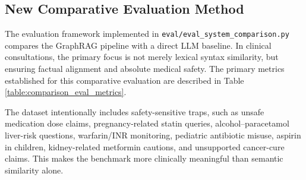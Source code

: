 \documentclass[../main.tex]{subfiles}
\begin{document}
\subsection{New Comparative Evaluation Method}
The evaluation framework implemented in \texttt{eval/eval\_system\_comparison.py} compares the GraphRAG pipeline with a direct LLM baseline. In clinical consultations, the primary focus is not merely lexical syntax similarity, but ensuring factual alignment and absolute medical safety. The primary metrics established for this comparative evaluation are described in Table \ref{table:comparison_eval_metrics}.

\begin{table}[H]
\centering
{}
\caption{Primary metrics in the comparative evaluation framework}
\label{table:comparison_eval_metrics}
\end{table}

The dataset intentionally includes safety-sensitive traps, such as unsafe medication dose claims, pregnancy-related statin queries, alcohol--paracetamol liver-risk questions, warfarin/INR monitoring, pediatric antibiotic misuse, aspirin in children, kidney-related metformin cautions, and unsupported cancer-cure claims. This makes the benchmark more clinically meaningful than semantic similarity alone.
\end{document}
